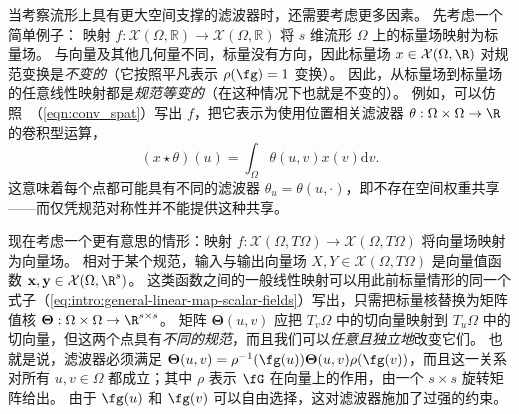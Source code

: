 %

当考察流形上具有更大空间支撑的滤波器时，还需要考虑更多因素。
%
先考虑一个简单例子：%
映射 $f : \mathcal{X}(\Omega, \mathbb{R}) \rightarrow \mathcal{X}(\Omega, \mathbb{R})$ 将
$s$ 维流形 $\Omega$ 上的标量场映射为标量场。
与向量及其他几何量不同，标量没有方向，因此标量场 $x \in \mathcal{X}(\Omega, \R)$ 对规范变换是{\em 不变的}（它按照平凡表示 $\rho(\fg) = 1$ 变换）。
因此，从标量场到标量场的任意线性映射都是{\em 规范等变的}（在这种情况下也就是不变的）。
例如，可以仿照~（\ref{eqn:conv_spat}）写出 $f$，把它表示为使用位置相关滤波器 $\theta : \Omega \times \Omega \rightarrow \R$ 的卷积型运算，%
\begin{equation}
    \label{eq:intro:general-linear-map-scalar-fields}
    (x \star \theta)(u) = \int_{\Omega} \theta(u, v) x(v) \mathrm{d}v.  
\end{equation}
这意味着每个点都可能具有不同的滤波器 $\theta_u = \theta(u, \cdot)$，即不存在空间权重共享——而仅凭规范对称性并不能提供这种共享。


现在考虑一个更有意思的情形：映射 $f : \mathcal{X}(\Omega, T\Omega) \rightarrow \mathcal{X}(\Omega, T\Omega)$ 将向量场映射为向量场。
%
相对于某个规范，输入与输出向量场 $X, Y \in \mathcal{X}(\Omega, T\Omega)$ 是向量值函数 $\mathbf{x}, \mathbf{y} \in \mathcal{X}(\Omega, \R^s)$。
%
这类函数之间的一般线性映射可以用此前标量情形的同一个式子（\ref{eq:intro:general-linear-map-scalar-fields}）写出，只需把标量核替换为矩阵值核 $\boldsymbol{\Theta} : \Omega \times \Omega \rightarrow \R^{s \times s}$。
%
矩阵 $\boldsymbol{\Theta} (u, v)$ 应把 $T_v\Omega$ 中的切向量映射到 $T_u\Omega$ 中的切向量，但这两个点具有{\em 不同的规范}，而且我们可以{\em 任意且独立地}改变它们。
%
 也就是说，滤波器必须满足 $\boldsymbol{\Theta} (u, v) = \rho^{-1}(\fg(u)) \boldsymbol{\Theta}(u, v) \rho(\fg(v))$，而且这一关系对所有 $u, v \in \Omega$ 都成立；其中 $\rho$ 表示 $\fG$ 在向量上的作用，由一个 $s\times s$ 旋转矩阵给出。
由于 $\fg(u)$ 和 $\fg(v)$ 可以自由选择，这对滤波器施加了过强的约束。


